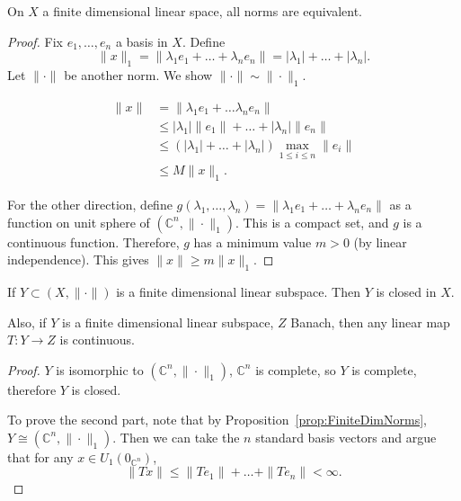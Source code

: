 \begin{proposition}
	\label{prop:FiniteDimNorms}
	On $X$ a finite dimensional linear space, all norms are equivalent.
\end{proposition}
\begin{proof}
	Fix $e_1, \ldots, e_n$ a basis in $X$. Define
	\[
		\|x\|_1 = \|\lambda_1 e_1 + \ldots + \lambda_n e_n\| = \left| \lambda_1 \right|  + \ldots + \left| \lambda_n \right| 
	.\] 
	Let $\|\cdot \|$ be another norm. We show $\|\cdot \|\sim \|\cdot \|_1$.

	\begin{align*}
		\|x\| &= \|\lambda_1 e_1 + \ldots \lambda_n e_n\| \\
		&\leq \left| \lambda_1 \right| \|e_1\| + \ldots + \left| \lambda_n \right| \|e_n\| \\
		&\leq \left( \left| \lambda_1 \right| + \ldots + \left| \lambda_n \right|  \right) \max_{1 \le i \le n} \|e_i\| \\
		&\leq M \|x\|_1 
	.\end{align*}

	For the other direction, define $g(\lambda_1, \ldots, \lambda_n) = \|\lambda_1 e_1 + \ldots + \lambda_n e_n\|$ as a function on unit sphere of $\left( \mathbb{C}^n, \|\cdot \|_1 \right) $. This is a compact set, and $g$ is a continuous function. Therefore, $g$ has a minimum value $m>0$ (by linear independence). This gives $\|x\| \ge  m \|x\|_1$.
\end{proof}

\begin{corollary}
	\label{cor:subspace closed}
	If $Y \subset (X, \|\cdot \|)$ is a finite dimensional linear subspace. Then $Y$ is closed in $X$.

	Also, if $Y$ is a finite dimensional linear subspace, $Z$ Banach, then any linear map $T:Y \to Z$ is continuous.
\end{corollary}
\begin{proof}
	$Y$ is isomorphic to $\left( \mathbb{C}^n, \|\cdot \|_1 \right) $, $\mathbb{C}^n$ is complete, so $Y$ is complete, therefore $Y$ is closed.

	To prove the second part, note that by Proposition~\ref{prop:FiniteDimNorms}, $Y \cong (\mathbb{C}^n, \|\cdot \|_1)$. Then we can take the $n$ standard basis vectors and argue that for any $x \in U_1(0_{\mathbb{C}^n})$,
	\[
		\|T x\| \le \|T e_1\| + \ldots + \|T e_n\| < \infty 
	.\] 
\end{proof}



